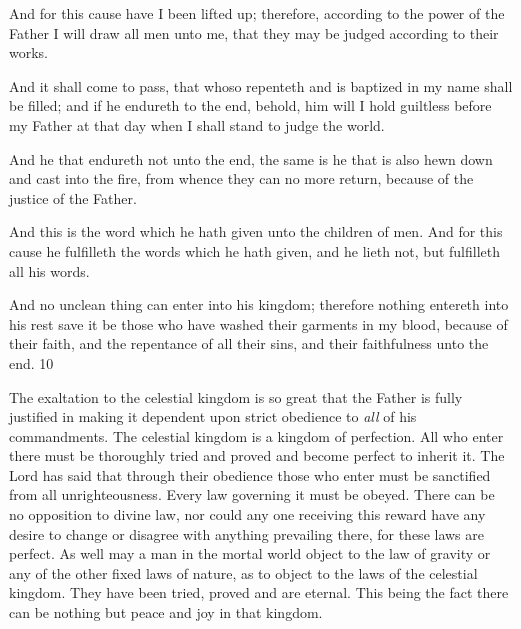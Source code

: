 And for this cause have I been lifted up; therefore, according to the power of the Father I will
draw all men unto me, that they may be judged according to their works.

And it shall come to pass, that whoso repenteth and is baptized in my name shall be filled;
and if he endureth to the end, behold, him will I hold guiltless before my Father at that day
when I shall stand to judge the world.

And he that endureth not unto the end, the same is he that is also hewn down and cast into the
fire, from whence they can no more return, because of the justice of the Father.

And this is the word which he hath given unto the children of men. And for this cause he
fulfilleth the words which he hath given, and he lieth not, but fulfilleth all his words.

And no unclean thing can enter into his kingdom; therefore nothing entereth into his rest save
it be those who have washed their garments in my blood, because of their faith, and the
repentance of all their sins, and their faithfulness unto the end. 10

The exaltation to the celestial kingdom is so great that the Father is fully justified in making
it dependent upon strict obedience to \textit{all} of his commandments. The celestial kingdom is a
kingdom of perfection. All who enter there must be thoroughly tried and proved and become
perfect to inherit it. The Lord has said that through their obedience those who enter must be
sanctified from all unrighteousness. Every law governing it must be obeyed. There can be no
opposition to divine law, nor could any one receiving this reward have any desire to change
or disagree with anything prevailing there, for these laws are perfect. As well may a man in
the mortal world object to the law of gravity or any of the other fixed laws of nature, as to
object to the laws of the celestial kingdom. They have been tried, proved and are eternal.
This being the fact there can be nothing but peace and joy in that kingdom.

